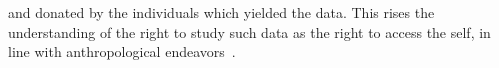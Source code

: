 																																																																																																																																																																																																																																																																																																																																																																																																																																																																																																																																																			and donated by the individuals which yielded the data.
																																																																																																																																																																																																																																																																																																																																																																																																																																																																																																																																																			This rises the understanding of the right to study such data as the right to access the self,
																																																																																																																																																																																																																																																																																																																																																																																																																																																																																																																																																			in line with anthropological endeavors~\cite{antphy,antphy2}.


